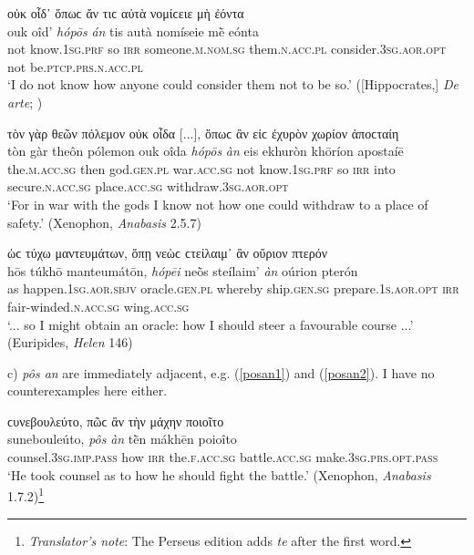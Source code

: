 \begin{exe}
\ex οὐκ οἶδ᾽ ὅπωϲ ἄν τιϲ αὐτὰ νομίϲειε μὴ ἐόντα\\
\gll ouk oîd' \emph{hópōs} \emph{án} tis autà nomíseie mḕ eónta\\
not know.\textsc{1sg.prf} so \textsc{irr} someone.\textsc{m.nom.sg} them.\textsc{n.acc.pl} consider.\textsc{3sg.aor.opt} not be.\textsc{ptcp.prs.n.acc.pl}\\
\trans `I do not know how anyone could consider them not to be so.' ({[}Hippocrates,{]} \textit{De arte}; \citealp[42, line 20]{Gomperz1890})
\label{oposan9}
\end{exe}

\begin{exe}
\ex τὸν γὰρ θεῶν πόλεμον οὐκ οἶδα {[}...{]}, ὅπωϲ ἂν εἰϲ
ἐχυρὸν χωρίον ἀποϲταίη\\
\gll tòn gàr theôn pólemon ouk oîda \emph{hópōs} \emph{àn} eis ekhuròn khōríon apostaíē\\
the.\textsc{m.acc.sg} then god.\textsc{gen.pl} war.\textsc{acc.sg} not know.\textsc{1sg.prf} so \textsc{irr} into secure.\textsc{n.acc.sg} place.\textsc{acc.sg} withdraw.\textsc{3sg.aor.opt}\\
\trans `For in war with the gods I know not how one could withdraw to a place of safety.' (Xenophon, \textit{Anabasis} 2.5.7)
\label{oposan10}
\end{exe}

\begin{exe}
\ex ὡϲ τύχω μαντευμάτων, ὅπῃ νεὼϲ ϲτείλαιμ᾽ ἂν οὔριον πτερόν\\
\gll hōs túkhō manteumátōn, \emph{hópēi} neṑs steílaim' \emph{àn} oúrion pterón\\
as happen.\textsc{1sg.aor.sbjv} oracle.\textsc{gen.pl} whereby
ship.\textsc{gen.sg} prepare.\textsc{1s.aor.opt} \textsc{irr} 
fair-winded.\textsc{n.acc.sg} wing.\textsc{acc.sg}\\
\trans `... so I might obtain an oracle: how I should steer a favourable course ...' (Euripides, \textit{Helen} 146)
\label{opeian}
\end{exe}

c) \emph{pôs an} are immediately adjacent, e.g. (\ref{posan1}) and (\ref{posan2}). I have no counterexamples here either.

\begin{exe}
\ex ϲυνεβουλεύτο, πῶϲ ἂν τὴν μάχην ποιοῖτο\\
\gll sunebouleúto, \emph{pôs} \emph{àn} tḕn mákhēn poioîto\\
counsel.\textsc{3sg.imp.pass} how \textsc{irr} the.\textsc{f.acc.sg} battle.\textsc{acc.sg} make.\textsc{3sg.prs.opt.pass}\\
\trans `He took counsel as to how he should fight the battle.' (Xenophon, \textit{Anabasis} 1.7.2)\footnote{\emph{Translator's note}: The Perseus edition adds \textit{te} after the first word.}
\label{posan1}
\end{exe}

